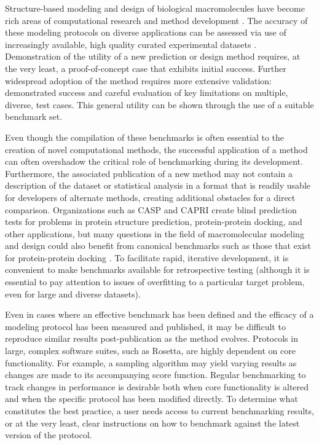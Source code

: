 Structure-based modeling and design of biological macromolecules have become rich areas of computational research and method development \cite{leaver-fay_rosetta3:_2011,webb_comparative_2002,brooks_charmm:_2009,case_amber_200,jorgensen_development_1996}. The accuracy of these modeling protocols on diverse applications can be assessed via use of increasingly available, high quality curated experimental datasets \cite{berman_protein_2000,kumar_protherm_2006,bento_chembl_2014,moal_skempi:_2012,mintseris_proteinprotein_2005}. Demonstration of the utility of a new prediction or design method requires, at the very least, a proof-of-concept case that exhibits initial success. Further widespread adoption of the method requires more extensive validation: demonstrated success and careful evaluation of key limitations on multiple, diverse, test cases. This general utility can be shown through the use of a suitable benchmark set.

Even though the compilation of these benchmarks is often essential to the creation of novel computational methods, the successful application of a method can often overshadow the critical role of benchmarking during its development. Furthermore, the associated publication of a new method may not contain a description of the dataset or statistical analysis in a format that is readily usable for developers of alternate methods, creating additional obstacles for a direct comparison. Organizations such as CASP \cite{moult_critical_2014} and CAPRI \cite{janin_third_2007} create blind prediction tests for problems in protein structure prediction, protein-protein docking, and other applications, but many questions in the field of macromolecular modeling and design could also benefit from canonical benchmarks such as those that exist for protein-protein docking \cite{mintseris_proteinprotein_2005,moult_critical_2014,janin_third_2007,hwang_proteinprotein_2010}. To facilitate rapid, iterative development, it is convenient to make benchmarks available for retrospective testing (although it is essential to pay attention to issues of overfitting to a particular target problem, even for large and diverse datasets).

Even in cases where an effective benchmark has been defined and the efficacy of a modeling protocol has been measured and published, it may be difficult to reproduce similar results post-publication as the method evolves. Protocols in large, complex software suites, such as Rosetta, are highly dependent on core functionality. For example, a sampling algorithm may yield varying results as changes are made to its accompanying score function. Regular benchmarking to track changes in performance is desirable both when core functionality is altered and when the specific protocol has been modified directly. To determine what constitutes the best practice, a user needs access to current benchmarking results, or at the very least, clear instructions on how to benchmark against the latest version of the protocol.


